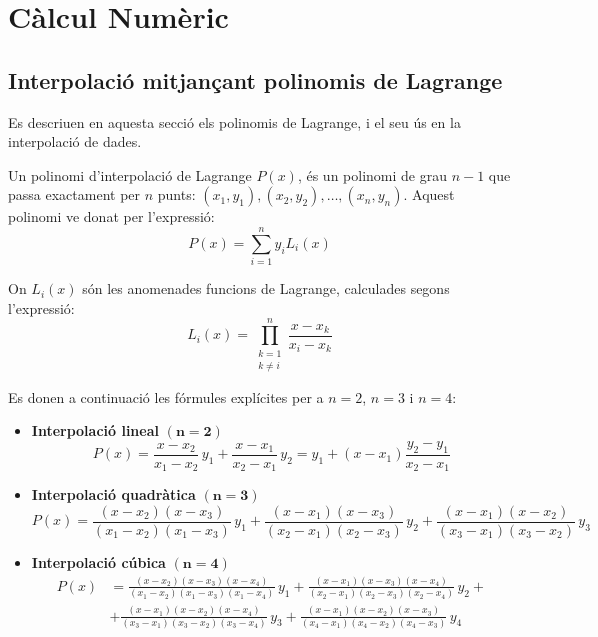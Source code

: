 \chapter{Càlcul Numèric} 

\section{Interpolació mitjançant polinomis de Lagrange}
\label{sec:poli_lagr}

Es descriuen en aquesta secció els polinomis de Lagrange, i el seu ús en la interpolació de dades.

Un polinomi d'interpolació de Lagrange $P(x)$, és un polinomi de grau $n-1$ que passa exactament per $n$ punts:
$(x_1, y_1), (x_2, y_2), \dots, (x_n, y_n)$. Aquest polinomi ve donat per l'expressió:
\begin{equation}
  P(x) = \sum_{i=1}^{n}  y_i L_i(x) \label{eq:poly_lag_1}
\end{equation}

On $L_i(x)$ són les anomenades funcions de Lagrange, calculades segons l'expressió:
\begin{equation}
  L_i(x) = \prod_{\substack{k=1 \\ k\neq i}}^{n} \frac{x-x_k}{x_i-x_k} \label{eq:poly_lag_2}
\end{equation}

Es donen a continuació les fórmules explícites per a $n = 2$, $n=3$ i $n=4$:

\begin{itemize}
    \item \textbf{Interpolació lineal} $\boldsymbol{(n=2)}$ 
    \begin{equation}\label{eq:interp_lin}
      P(x) = \frac{x-x_2}{x_1-x_2}\, y_1 + \frac{x-x_1}{x_2-x_1}\, y_2 = y_1 + (x-x_1) \frac{y_2-y_1}{x_2-x_1}
    \end{equation}

    \item \textbf{Interpolació quadràtica} $\boldsymbol{(n=3)}$ 
    \begin{equation}
      P(x) = \frac{(x-x_2)(x-x_3)}{(x_1-x_2)(x_1-x_3)}\, y_1 + \frac{(x-x_1)(x-x_3)}{(x_2-x_1)(x_2-x_3)}\, y_2 +
      \frac{(x-x_1)(x-x_2)}{(x_3-x_1)(x_3-x_2)}\, y_3
    \end{equation}

    \item \textbf{Interpolació cúbica} $\boldsymbol{(n=4)}$ 
    \begin{equation}\begin{split}\label{eq:interp_cub}
      P(x) &= \frac{(x-x_2)(x-x_3)(x-x_4)}{(x_1-x_2)(x_1-x_3)(x_1-x_4)}\, y_1 +
              \frac{(x-x_1)(x-x_3)(x-x_4)}{(x_2-x_1)(x_2-x_3)(x_2-x_4)}\, y_2 + {} \\[1.5ex]
           &+ \frac{(x-x_1)(x-x_2)(x-x_4)}{(x_3-x_1)(x_3-x_2)(x_3-x_4)}\, y_3 +
              \frac{(x-x_1)(x-x_2)(x-x_3)}{(x_4-x_1)(x_4-x_2)(x_4-x_3)}\, y_4
    \end{split}\end{equation}
\end{itemize}


